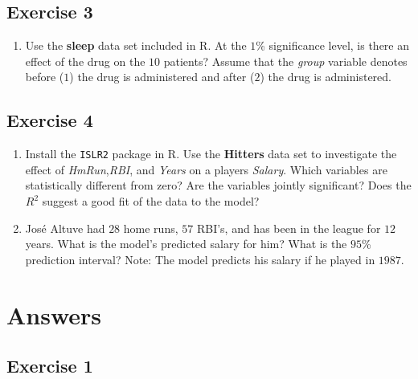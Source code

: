 \documentclass[
  letterpaper,
  DIV=11,
  numbers=noendperiod]{scrreprt}
\providecommand{\tightlist}{%
  \setlength{\itemsep}{0pt}\setlength{\parskip}{0pt}}\usepackage{longtable,booktabs,array}
\begin{document}
\hypertarget{exercise-3-26}{%
\subsection*{Exercise 3}\label{exercise-3-26}}

\begin{enumerate}
\def\labelenumi{\arabic{enumi}.}
\tightlist
\item
  Use the \textbf{sleep} data set included in R. At the \(1\)\%
  significance level, is there an effect of the drug on the \(10\)
  patients? Assume that the \emph{group} variable denotes before (\(1\))
  the drug is administered and after (\(2\)) the drug is administered.
\end{enumerate}

\hypertarget{exercise-4-14}{%
\subsection*{Exercise 4}\label{exercise-4-14}}

\begin{enumerate}
\def\labelenumi{\arabic{enumi}.}
\item
  Install the \texttt{ISLR2} package in R. Use the \textbf{Hitters} data
  set to investigate the effect of \emph{HmRun},\emph{RBI}, and
  \emph{Years} on a players \emph{Salary}. Which variables are
  statistically different from zero? Are the variables jointly
  significant? Does the \(R^2\) suggest a good fit of the data to the
  model?
\item
  José Altuve had \(28\) home runs, \(57\) RBI's, and has been in the
  league for \(12\) years. What is the model's predicted salary for him?
  What is the \(95\)\% prediction interval? Note: The model predicts his
  salary if he played in \(1987\).
\end{enumerate}

\hypertarget{answers-13}{%
\section{Answers}\label{answers-13}}

\hypertarget{exercise-1-27}{%
\subsection*{Exercise 1}\label{exercise-1-27}}
\end{document}
